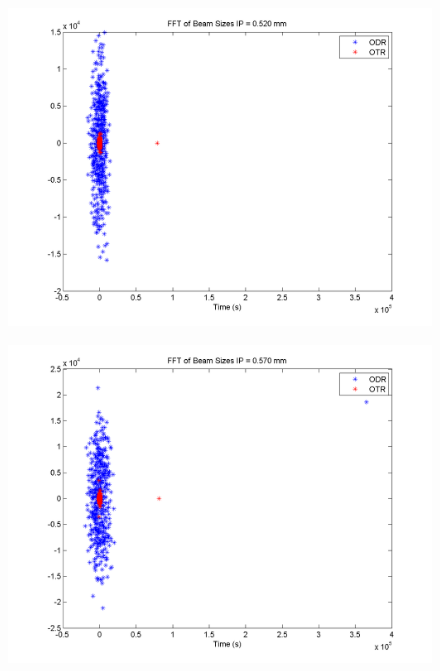 \documentclass[12pt]{article}
\begin{document}
\begin{figure}
\begin{center}
\includegraphics[scale=0.5]{Figures/FFT_520.PNG}
\caption{}
\end{center}
\end{figure}

\begin{figure}
\begin{center}
\includegraphics[scale=0.5]{Figures/FFT_570.PNG}
\caption{}
\end{center}
\end{figure}
\end{document}

